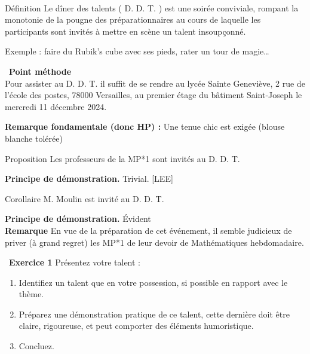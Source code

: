 \documentclass[14pt,a4paper]{extarticle}
\begin{document}
\ 
\newpage
\begin{Thm}{Définition}
    Le dîner des talents ( D. D. T. ) est une soirée conviviale, rompant la monotonie de la pougne des préparationnaires au cours de laquelle les participants sont invités à mettre en scène un talent insoupçonné.
\end{Thm}


\begin{Ex}
    Exemple : faire du Rubik's cube avec ses pieds, rater un tour de magie\dots
\end{Ex}
\begin{Exo}
    \ \textbf{Point méthode }\\
    Pour assister au D. D. T. il suffit de se rendre au lycée Sainte Geneviève, 2 rue de l'école des postes, 78000 Versailles, au premier étage du bâtiment Saint-Joseph le mercredi 11 décembre 2024.
\end{Exo}
\smallskip

\textbf{Remarque fondamentale (donc HP) : } Une tenue chic est exigée (blouse blanche tolérée)


\begin{Thm}{Proposition}
    Les professeurs de la MP*1 sont invités au D. D. T. 
\end{Thm}

\textbf{Principe de démonstration. } Trivial. [LEE]

\begin{Thm}{Corollaire}
    M. Moulin est invité au D. D. T.
\end{Thm}
\textbf{Principe de démonstration. } Évident\\

\textbf{Remarque }En vue de la préparation de cet événement, il semble judicieux de priver (à grand regret) les MP*1 de leur devoir de Mathématiques hebdomadaire.\\

\begin{Exo}
\ \textbf{Exercice 1 } Présentez votre talent : 
\begin{enumerate}
    \item Identifiez un talent que en votre possession, si possible en rapport avec le thème.
    \item Préparez une démonstration pratique de ce talent, cette dernière doit être claire, rigoureuse, et peut comporter des éléments humoristique.
    \item Concluez.
\end{enumerate}

\end{Exo}
\end{document}
